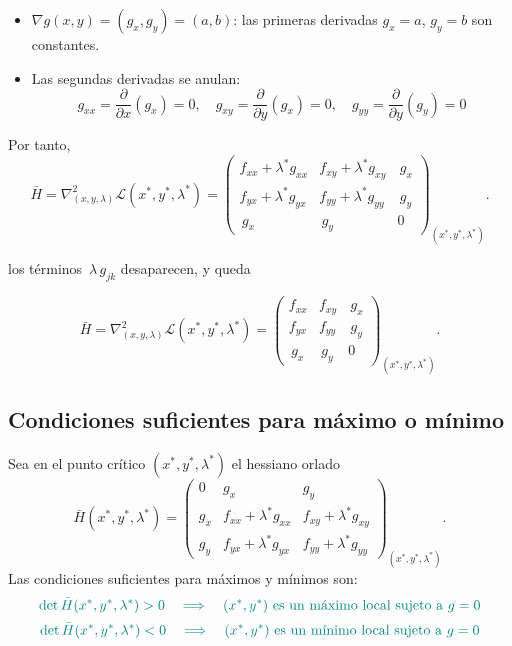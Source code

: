 \documentclass{article}
\begin{document}
\begin{itemize}
  \item \(\displaystyle \nabla g(x,y) = (g_x, g_y) = (a, b)\): las primeras derivadas \(g_x=a\), \(g_y=b\) son constantes.
  \item Las segundas derivadas se anulan:
  \[
    g_{xx} = \frac{\partial}{\partial x}(g_x) = 0,
    \quad
    g_{xy} = \frac{\partial}{\partial y}(g_x) = 0,
    \quad
    g_{yy} = \frac{\partial}{\partial y}(g_y) = 0
  \]
\end{itemize}

Por tanto,
\[
\bar{H}=\nabla^2_{(x,y,\lambda)}\mathcal L(x^*,y^*,\lambda^*)
=
\begin{pmatrix}
f_{xx}+\lambda^*g_{xx} & f_{xy}+\lambda^*g_{xy} & \,g_x \\[6pt]
f_{yx}+\lambda^*g_{yx} & f_{yy}+\lambda^*g_{yy} &\,g_y \\[6pt]
\,g_x & \,g_y & 0
\end{pmatrix}_{(x^*,y^*,\lambda^*)}.
\]


los términos \(\,
\lambda\,g_{jk}\) desaparecen, y queda



\[
\bar{H}=\nabla^2_{(x,y,\lambda)}\mathcal L(x^*,y^*,\lambda^*)
=
\begin{pmatrix}
f_{xx} & f_{xy} &\,g_x \\[6pt]
f_{yx} & f_{yy} & \,g_y \\[6pt]
\,g_x & \,g_y & 0
\end{pmatrix}_{(x^*,y^*,\lambda^*)}.
\]





\subsection*{Condiciones suficientes para máximo o mínimo}

Sea en el punto crítico \((x^*,y^*,\lambda^*)\) el hessiano orlado
\[
\bar{H}(x^*,y^*,\lambda^*)
=
\begin{pmatrix}
0 & g_x & g_y \\[4pt]
g_x & f_{xx}+\lambda^*g_{xx} & f_{xy}+\lambda^*g_{xy} \\[4pt]
g_y & f_{yx}+\lambda^*g_{yx} & f_{yy}+\lambda^*g_{yy}
\end{pmatrix}_{(x^*,y^*,\lambda^*)}.
\]
Las condiciones suficientes para máximos y mínimos son:
\[\color{teal}
\det \bar{H}(x^*,y^*,\lambda^*) > 0
\quad\Longrightarrow\quad
\text{\((x^*,y^*)\) es un máximo local sujeto a }g=0
\]
\[\color{teal}
\det \bar{H}(x^*,y^*,\lambda^*) < 0
\quad\Longrightarrow\quad
\text{\((x^*,y^*)\) es un mínimo local sujeto a }g=0
\]
\end{document}
